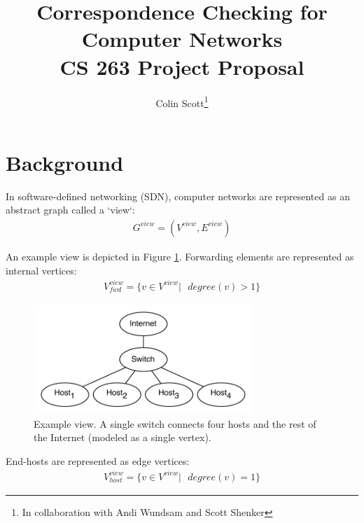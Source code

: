 \documentclass{sig-alternate-10pt}
\title{Correspondence Checking for Computer Networks \\
\Large{CS 263 Project Proposal \vspace{-25pt}}}
\author{Colin Scott\thanks{In collaboration with Andi
Wundsam and Scott Shenker}\vspace{-15pt}}
\date{}
\begin{document}
    \maketitle
    \thispagestyle{empty}
%
%
%
%  
\section{Background}

In software-defined networking (SDN), computer networks are represented
as an abstract graph called a `view`: 
\begin{align*}
G^{view} = (V^{view}, E^{view})
\end{align*}

An example view is depicted in Figure \ref{fig:app_view}. Forwarding elements are
represented as internal vertices:
\begin{align*}
V_{fwd}^{view} = \{ v \in V^{view} |\text{ } degree(v) > 1 \}
\end{align*}

\begin{figure}[t]
    \hspace{-10pt}
    \includegraphics[width=3.25in]{../diagrams/necula_views/app_view.pdf}
    \caption[]{\label{fig:app_view} Example view. A single switch connects 
    four hosts and the rest of the Internet (modeled as a single vertex).} 
\end{figure}

End-hosts are represented as edge vertices:
\begin{align*}
V_{host}^{view} = \{ v \in V^{view} |\text{ } degree(v) = 1 \}
\end{align*}
\end{document}
